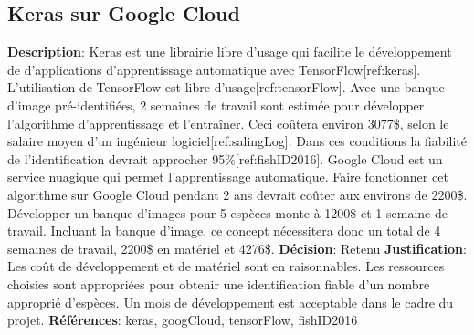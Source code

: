 

\subsection{Keras sur Google Cloud}
\label{s:identifier_conc4}

\textbf{Description}: Keras est une librairie libre d’usage qui facilite le développement de d’applications d’apprentissage automatique avec TensorFlow[ref:keras].  L’utilisation de TensorFlow est libre d’usage[ref:tensorFlow]. Avec une banque d’image pré-identifiées, 2 semaines de travail sont estimée pour développer l'algorithme d’apprentissage et l’entraîner. Ceci coûtera environ 3077\$, selon le salaire moyen d’un ingénieur logiciel[ref:salingLog]. Dans ces conditions la fiabilité de l’identification devrait approcher 95\%[ref:fishID2016]. Google Cloud est un service nuagique qui permet l’apprentissage automatique. Faire fonctionner cet algorithme sur Google Cloud pendant 2 ans devrait coûter aux environs de 2200\$. Développer un banque d’images pour 5 espèces monte à 1200\$ et 1 semaine de travail. Incluant la banque d’image, ce concept nécessitera donc un total de 4 semaines de travail, 2200\$ en matériel et 4276\$.
\textbf{Décision}: Retenu
\textbf{Justification}: Les coût de développement et de matériel sont en raisonnables. Les ressources choisies sont appropriées pour obtenir une identification fiable d’un nombre approprié d’espèces. Un mois de développement est acceptable dans le cadre du projet.
\textbf{Références}: keras, googCloud, tensorFlow, fishID2016
